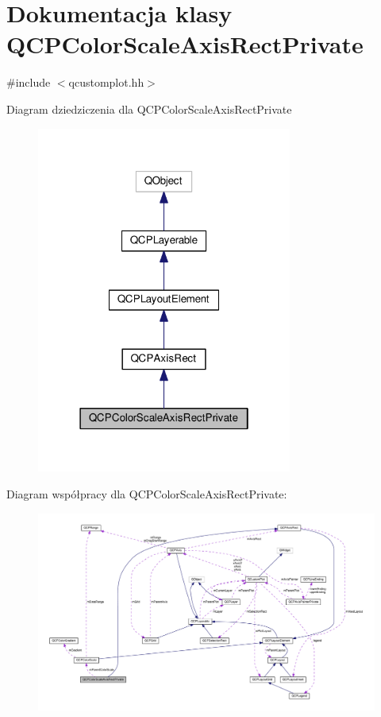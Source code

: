 \hypertarget{class_q_c_p_color_scale_axis_rect_private}{}\section{Dokumentacja klasy Q\+C\+P\+Color\+Scale\+Axis\+Rect\+Private}
\label{class_q_c_p_color_scale_axis_rect_private}


{\ttfamily \#include $<$qcustomplot.\+hh$>$}



Diagram dziedziczenia dla Q\+C\+P\+Color\+Scale\+Axis\+Rect\+Private\nopagebreak
\begin{figure}[H]
\begin{center}
\leavevmode
\includegraphics[width=238pt]{class_q_c_p_color_scale_axis_rect_private__inherit__graph}
\end{center}
\end{figure}


Diagram współpracy dla Q\+C\+P\+Color\+Scale\+Axis\+Rect\+Private\+:\nopagebreak
\begin{figure}[H]
\begin{center}
\leavevmode
\includegraphics[width=350pt]{class_q_c_p_color_scale_axis_rect_private__coll__graph}
\end{center}
\end{figure}
